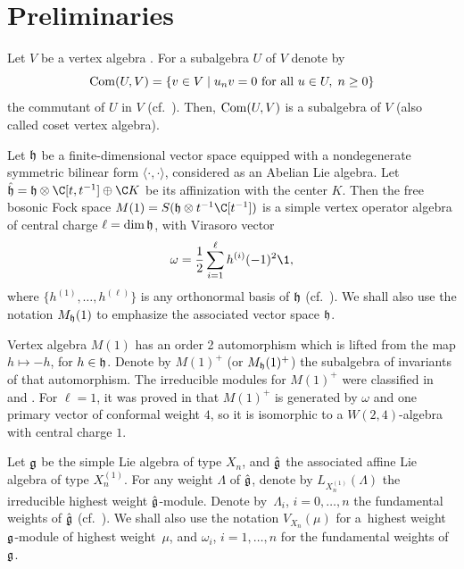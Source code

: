 \section{Preliminaries}

Let $V$ be a vertex algebra \cite{B, FHL, FLM,LL}. For a subalgebra $U$ of $V$ denote by
\[
{\rm Com}(U,V)= \{ v \in V \; | \; u_n v =0 \mbox{ for all } u \in U,\;
n \geq 0 \} \]
%
 the commutant of $U$ in $V$ (cf.~\cite{FZ, GKO,LL}). Then, ${\rm Com}(U,V)$ is a
subalgebra of $V$ (also called coset vertex algebra).



Let ${\frak h}$ be a f\/inite-dimensional vector space equipped with a
nondegenerate symmetric bilinear form $\langle \cdot, \cdot
\rangle$, considered as an Abelian Lie algebra. Let $\hat{\frak h} =
{\frak h} \otimes {\C}[t,t^{-1}] \oplus {\C} K$ be its af\/f\/inization
with the center $K$. Then the free bosonic Fock space
$M(1) = S({\frak h} \otimes t^{-1} \C[t^{-1}])$ is a simple vertex
operator algebra of central charge $\ell = \dim {\frak h}$, with
Virasoro vector
\[
 \omega =\frac{1}{2} \sum _{i=1}^{\ell} h^{(i)}(-1)^2 {\1},\]
  where
$\{ h^{(1)}, \ldots , h^{(\ell)} \} $ is any orthonormal basis of
${\frak h}$ (cf.~\cite{FLM, LL}). We shall also use the
notation $M_{\frak h}(1)$ to emphasize the associated vector space
${\frak h}$.

Vertex algebra $M(1)$  has an order 2 automorphism which is lifted
from the map $h \mapsto -h$, for $h \in {\frak h}$. Denote by  $M(1)
^+$ (or $M_{\frak h}(1) ^+$) the subalgebra of invariants of that
automorphism. The irreducible modules for $M(1) ^+$ were classif\/ied
in \cite{DN1} and \cite{DN2}. For $\ell =1$, it was proved in
\cite{DG} that $M(1) ^+$ is generated by $\omega$ and one primary
vector of conformal weight $4$, so it is isomorphic to a
$W(2,4)$-algebra with central charge $1$.

Let $\frak g$ be the simple Lie algebra of type $X_{n}$, and
$\hat{\frak g}$ the associated af\/f\/ine Lie algebra of type
$X_{n}^{(1)}$. For any weight $\Lambda$ of $\hat{\frak g}$, denote
by $L_{X_{n} ^{(1)}}(\Lambda)$ the irreducible highest weight
$\hat{\frak g}$-module. Denote by~$\Lambda _i$, $i=0, \ldots, n$ the
fundamental weights of $\hat{\frak g}$ (cf.~\cite{K1}). We shall
also use the notation $V_{X_n}(\mu)$ for a~highest weight $\frak
g$-module of highest weight~$\mu$, and $\omega _i$, $i=1, \ldots, n$
for the fundamental weights of~$\frak g$.


